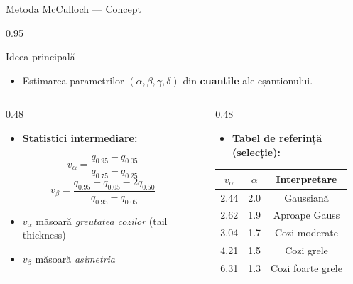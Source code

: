 \documentclass[9pt, aspectratio=169, t]{beamer}
\begin{document}
\begin{frame}{Metoda McCulloch --- Concept}
    \begin{cminipage}{0.95\textwidth}
\begin{block}{Ideea principală}
\begin{itemize}\setlength{\itemsep}{0pt}
    \item Estimarea parametrilor $(\alpha, \beta, \gamma, \delta)$ din \textbf{cuantile} ale eșantionului.
\end{itemize}
\end{block}

\begin{columns}[T]
\begin{column}{0.48\textwidth}
\begin{itemize}\setlength{\itemsep}{0pt}
    \item \textbf{Statistici intermediare:}
\end{itemize}
$$v_\alpha = \frac{q_{0.95} - q_{0.05}}{q_{0.75} - q_{0.25}}$$
$$v_\beta = \frac{q_{0.95} + q_{0.05} - 2q_{0.50}}{q_{0.95} - q_{0.05}}$$

\vspace{0.2cm}
\begin{itemize}\setlength{\itemsep}{0pt}
    \item $v_\alpha$ măsoară \textit{greutatea cozilor} (tail thickness)
    \item $v_\beta$ măsoară \textit{asimetria}
\end{itemize}
\end{column}
\begin{column}{0.48\textwidth}
\begin{itemize}\setlength{\itemsep}{0pt}
    \item \textbf{Tabel de referință (selecție):}
\end{itemize}

\renewcommand{\arraystretch}{1.2}
\begin{tabular}{ccc}
\toprule
$v_\alpha$ & $\alpha$ & Interpretare \\
\midrule
2.44 & 2.0 & Gaussiană \\
2.62 & 1.9 & Aproape Gauss \\
3.04 & 1.7 & Cozi moderate \\
4.21 & 1.5 & Cozi grele \\
6.31 & 1.3 & Cozi foarte grele \\
\bottomrule
\end{tabular}
\end{column}
\end{columns}
    \end{cminipage}
\end{frame}
\end{document}
